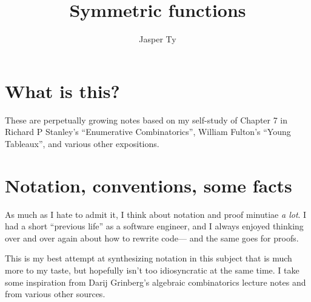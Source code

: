 \documentclass{article}
\title{Symmetric functions}
\author{Jasper Ty}
\date{}
\begin{document}
\maketitle

\section*{What is this?}

These are perpetually growing notes based on my self-study of Chapter 7 in Richard P Stanley's ``Enumerative Combinatorics'', William Fulton's ``Young Tableaux'', and various other expositions. 

\iffalse 
I've learned to \textit{love} this subject! At first, I thought ``Functions that remain the same change under interchange of variables? What's so interesting about that?'', but at some point between now and the end of my undergraduate life, I took it on myself to \textit{compute} with these things, to hold them with my bare hands, and lo--- I suddenly found myself baptized in the waters of symmetric polynomials.

I'm not entirely sure how to write for an audience yet, so certain things might be over or under explained, and this might happen all over the place!
I guess, one has to have had some combinatorics, knowing about posets, partitions, coming up with bijections, and so on. 
Also experience with working with formal power series probably helps.

I'll be honest and say algebra is not my strong suit, so I apologize in advance if that manifests particularly clearly in some sections.
\fi


\tableofcontents

\section*{Notation, conventions, some facts}

\iffalse
As much as I hate to admit it, I think about notation and proof minutiae \textit{a lot}.
I had a short ``previous life'' as a software engineer, and I always enjoyed thinking over and over again about how to rewrite code--- and the same goes for proofs.

This is my best attempt at synthesizing notation in this subject that is much more to my taste, but hopefully isn't too idiosyncratic at the same time.
I take some inspiration from Darij Grinberg's algebraic combinatorics lecture notes \cite{DarijAC} and from various other sources.
\end{document}
